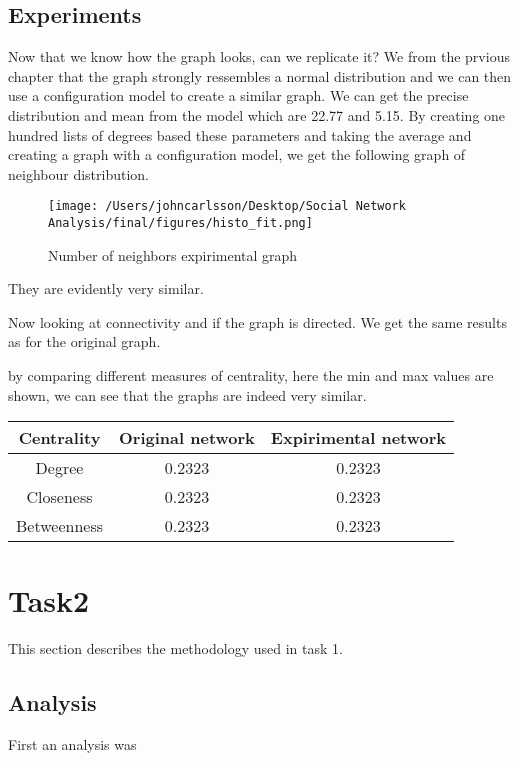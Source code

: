 \documentclass[conference]{IEEEtran}
\begin{document}
\subsection[short]{Experiments}
Now that we know how the graph looks, can we replicate it? We from the prvious chapter that the graph strongly
ressembles a normal distribution and we can then use a configuration model to create a similar graph.
We can get the precise distribution and mean from the model which are 22.77 and 5.15.
By creating one hundred lists of degrees based these parameters and taking the average and creating a graph with 
a configuration model, we get the following graph of neighbour distribution.

\begin{figure}[h]
    \centering
    \caption{Number of neighbors expirimental graph}
\texttt{[image: /Users/johncarlsson/Desktop/Social Network Analysis/final/figures/histo\_fit.png]}
\end{figure}

They are evidently very similar.

Now looking at connectivity and if the graph is directed. We get the same results as for the original graph.

by comparing different measures of centrality, here the min and max values are shown, we can see 
that the graphs are indeed very similar.

\begin{center}
    \begin{tabular}{|c|c|c|}
        
        \hline
        Centrality & Original network & Expirimental network \\
        \hline
        Degree & 0.2323 & 0.2323 \\
        \hline
        Closeness & 0.2323 & 0.2323 \\
        \hline
        Betweenness & 0.2323 & 0.2323 \\
        \hline
    \end{tabular}

\end{center}



\section{Task2}
This section describes the methodology used in task 1.

\subsection{Analysis}
First an analysis was
\end{document}
